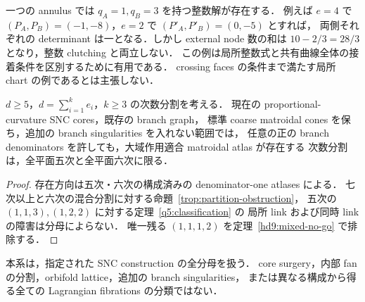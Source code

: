 \begin{remark}[局所算術解と共有曲線の接着]
\label{hd9:node-budget}
一つの annulus では $q_A=1,q_B=3$ を持つ整数解が存在する．
例えば $e=4$ で $(P_A,P_B)=(-1,-8)$，$e=2$ で $(P'_A,P'_B)=(0,-5)$ とすれば，
両側それぞれの determinant は一となる．しかし external node 数の和は
$10-2/3=28/3$ となり，整数 clutching と両立しない．
この例は局所整数式と共有曲線全体の接着条件を区別するために有用である．
crossing faces の条件まで満たす局所 chart の例であるとは主張しない．
\end{remark}

\begin{corollary}\label{hd9:classification}
$d\ge5$，$d=\sum_{i=1}^ke_i$，$k\ge3$ の次数分割を考える．
現在の proportional-curvature SNC cores，既存の branch graph，
標準 coarse matroidal cones を保ち，追加の branch singularities を入れない範囲では，
任意の正の branch denominators を許しても，大域作用適合 matroidal atlas が存在する
次数分割は，全平面五次と全平面六次に限る．
\end{corollary}

\begin{proof}
存在方向は五次・六次の構成済みの denominator-one atlases による．
七次以上と六次の混合分割に対する命題~\ref{trop:partition-obstruction}，
五次の $(1,1,3),(1,2,2)$ に対する定理~\ref{q5:classification} の
局所 link および同時 link の障害は分母によらない．
唯一残る $(1,1,1,2)$ を定理~\ref{hd9:mixed-no-go} で排除する．
\end{proof}

本系は，指定された SNC construction の全分母を扱う．
core surgery，内部 fan の分割，orbifold lattice，追加の branch singularities，
または異なる構成から得る全ての Lagrangian fibrations の分類ではない．
